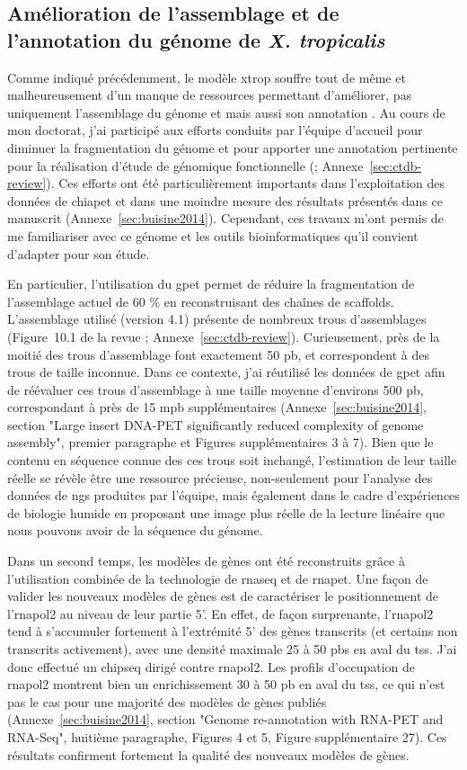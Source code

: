\documentclass[../main.tex]{subfiles}
\begin{document}
\subsection{Amélioration de l'assemblage et de l'annotation du génome de \textit{X. tropicalis}}
Comme indiqué précédemment, le modèle \gls{xtrop} souffre tout de même et malheureusement d'un manque de ressources permettant d'améliorer, pas uniquement l'assemblage du génome et mais aussi son annotation \citep{Gilchrist2012}.
Au cours de mon doctorat, j'ai participé aux efforts conduits par l'équipe d'accueil pour diminuer la fragmentation du génome et pour apporter une annotation pertinente pour la réalisation d'étude de génomique fonctionnelle (\citealp{Grimaldi2013}; Annexe~\ref{sec:ctdb-review}).
Ces efforts ont été particulièrement importants dans l'exploitation des données de \gls{chiapet} et dans une moindre mesure des résultats présentés dans ce manuscrit (Annexe~\ref{sec:buisine2014}).
Cependant, ces travaux m'ont permis de me familiariser avec ce génome et les outils bioinformatiques qu'il convient d'adapter pour son étude.
\par
En particulier, l'utilisation du \gls{gpet} permet de réduire la fragmentation de l'assemblage actuel de 60 \% en reconstruisant des chaînes de scaffolds.
L'assemblage utilisé (version 4.1) présente de nombreux trous d'assemblages (Figure~10.1 de la revue \citealp{Grimaldi2013}; Annexe~\ref{sec:ctdb-review}).
Curieusement, près de la moitié des trous d'assemblage font exactement 50 \gls{pb}, et correspondent à des trous de taille inconnue.
Dans ce contexte, j'ai réutilisé les données de \gls{gpet} afin de réévaluer ces trous d'assemblage à une taille moyenne d'environs 500 \gls{pb}, correspondant à près de 15 \gls{mpb} supplémentaires (Annexe~\ref{sec:buisine2014}, section "Large insert DNA-PET significantly reduced complexity of genome assembly", premier paragraphe et Figures supplémentaires 3 à 7).
Bien que le contenu en séquence connue des ces trous soit inchangé, l'estimation de leur taille réelle se révèle être une ressource précieuse, non-seulement pour l'analyse des données de \gls{ngs} produites par l'équipe, mais également dans le cadre d'expériences de biologie humide en proposant une image plus réelle de la lecture linéaire que nous pouvons avoir de la séquence du génome.
\par
Dans un second temps, les modèles de gènes ont été reconstruits grâce à l'utilisation combinée de la technologie de \gls{rnaseq} et de \gls{rnapet}.
Une façon de valider les nouveaux modèles de gènes est de caractériser le positionnement de l'\gls{rnapol2} au niveau de leur partie 5'.
En effet, de façon surprenante, l'\gls{rnapol2} tend à s'accumuler fortement à l'extrémité 5' des gènes transcrits (et certains non transcrits activement), avec une densité maximale 25 à 50 \glspl{pb} en aval du \gls{tss}.
J'ai donc effectué un \gls{chipseq} dirigé contre \gls{rnapol2}.
Les profils d'occupation de \gls{rnapol2} montrent bien un enrichissement 30 à 50 \gls{pb} en aval du \gls{tss}, ce qui n'est pas le cas pour une majorité des modèles de gènes publiés (Annexe~\ref{sec:buisine2014}, section "Genome re-annotation with RNA-PET and RNA-Seq", huitième paragraphe, Figures 4 et 5, Figure supplémentaire 27).
Ces résultats confirment fortement la qualité des nouveaux modèles de gènes.
\end{document}
